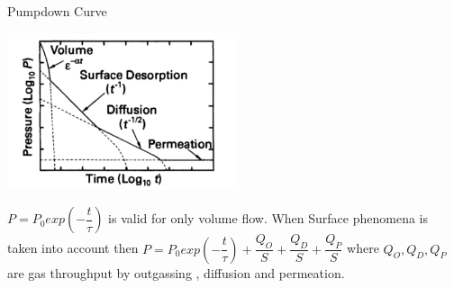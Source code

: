 \documentclass[11]{beamer}
\begin{document}
\begin{frame}{Pumpdown Curve}

\begin{center}
   			\includegraphics[width=0.5\textwidth]{PD.png}
   			
\end{center}
$P=P_{0}exp(-\dfrac{t}{\tau})  $ is valid for only volume flow. When Surface phenomena is taken into account then 
$P=P_{0}exp(-\dfrac{t}{\tau})+\dfrac{Q_{O}}{S} +\dfrac{Q_{D}}{S} +\dfrac{Q_{P}}{S} $ where $Q_{O},Q_{D},Q_{P}$ are gas throughput by outgassing , diffusion and permeation.
\end{frame}



   			

























\end{document}
